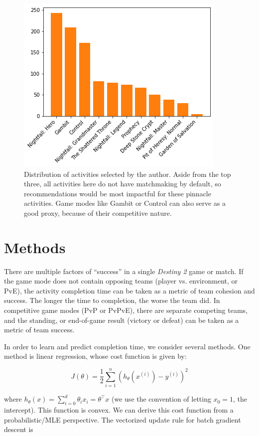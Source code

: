 \documentclass[conference]{IEEEtran}
\begin{document}
\begin{figure}[htbp]
    \centerline{\includegraphics[width=0.75\columnwidth]{figs/pinned.png}}
    \caption{Distribution of activities selected by the author. Aside from the top
        three, all activities here do not have matchmaking by default, so recommendations would be most impactful for these pinnacle activities. Game
        modes like Gambit or Control can also serve as a good proxy, because of their competitive nature.}
    \label{pinned}
\end{figure}

\section{Methods}\label{M}
There are multiple factors of ``success'' in a single \textit{Destiny 2}
game or match. If the game mode does not contain opposing teams (player vs.
environment, or PvE), the activity completion time can be taken as a metric of
team cohesion and success. The longer the time to completion, the worse the
team did. In competitive game modes (PvP or PvPvE), there are separate
competing teams, and the standing, or end-of-game result (victory or defeat)
can be taken as a metric of team success.

In order to learn and predict completion time, we consider several methods. One
method is linear regression, whose cost function is given by:

\begin{equation}
    J(\theta) = \frac{1}{2} \sum_{i = 1}^n
    (h_\theta (x^{(i)}) - y^{(i)})^2
\end{equation}

where $h_\theta(x) = \sum_{i=0}^d \theta_i x_i =
    \theta^\top
    x$ (we use the convention of letting
$x_0 = 1$, the intercept). This function is convex. We can derive
this cost function from a probabilistic/MLE perspective. The vectorized update
rule for batch gradient descent is
\end{document}

